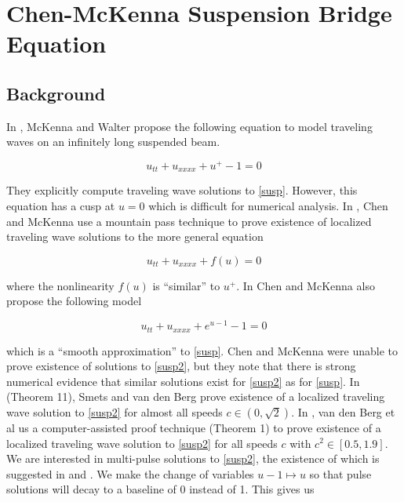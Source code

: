 \documentclass[12pt]{article}
\begin{document}
\section{Chen-McKenna Suspension Bridge Equation}

\subsection{Background}

In \cite{McKenna1990}, McKenna and Walter propose the following equation to model traveling waves on an infinitely long suspended beam.

\begin{equation}\label{susp}
u_{tt} + u_{xxxx} + u^+ - 1 = 0
\end{equation}

They explicitly compute traveling wave solutions to \eqref{susp}. However, this equation has a cusp at $u = 0$ which is difficult for numerical analysis. In \cite{Chen1997}, Chen and McKenna use a mountain pass technique to prove existence of localized traveling wave solutions to the more general equation

\begin{equation}\label{suspgen}
u_{tt} + u_{xxxx} + f(u) = 0
\end{equation}

where the nonlinearity $f(u)$ is ``similar'' to $u^+$. In \cite{Chen1997} Chen and McKenna also propose the following model

\begin{equation}\label{susp2}
u_{tt} + u_{xxxx} + e^{u - 1} - 1 = 0
\end{equation}

which is a ``smooth approximation'' to \eqref{susp}. Chen and McKenna were unable to prove existence of solutions to \eqref{susp2}, but they note that there is strong numerical evidence that similar solutions exist for \eqref{susp2} as for \eqref{susp}. In \cite{Smets2002} (Theorem 11), Smets and van den Berg prove existence of a localized traveling wave solution to \eqref{susp2} for almost all speeds $c \in (0, \sqrt{2})$. In \cite{Berg2018}, van den Berg et al us a computer-assisted proof technique (Theorem 1) to prove existence of a localized traveling wave solution to \eqref{susp2} for all speeds $c$ with $c^2 \in [0.5, 1.9]$.\\

We are interested in multi-pulse solutions to \eqref{susp2}, the existence of which is suggested in \cite{Chen1997} and \cite{Sandstede1997}. We make the change of variables $u - 1 \mapsto u$ so that pulse solutions will decay to a baseline of 0 instead of 1. This gives us
\end{document}

